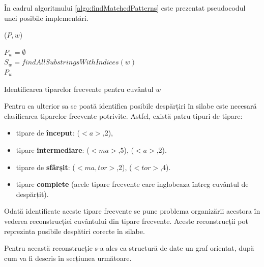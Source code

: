 În cadrul algoritmului \ref{algo:findMatchedPatterns} este prezentat pseudocodul unei posibile implementări.

\begin{algorithm}[H]
\vspace{.5cm}
\SetAlgoLined
{}

\ppg($P, w$) \\

$P_w = \emptyset$ \\
$S_w = findAllSubstringsWithIndices(w)$ \\
\KwRet $P_w$
\caption{Identificarea tiparelor frecvente pentru cuvântul $w$}
\label{algo:findMatchedPatterns}
\vspace{.5cm}
\end{algorithm}
\vspace{1cm}

Pentru ca ulterior sa se poată identifica posibile despărțiri în silabe este necesară clasificarea tiparelor frecvente potrivite. Astfel, există patru tipuri de tipare:  

\begin{itemize}
\item tipare de \textbf{început}: ($<a>$,2),
\item tipare \textbf{intermediare}: ($<ma>$,5), ($<a>$,2).
\item tipare de \textbf{sfârșit}: ($<ma, tor>$,2), ($<tor>$,4).  
\item tipare \textbf{complete} (acele tipare frecvente care inglobeaza întreg cuvântul de despărțit).
\end{itemize}



Odată identificate aceste tipare frecvente se pune problema organizării acestora în vederea reconstrucției cuvântului din tipare frecvente. Aceste reconstrucții pot reprezinta posibile despătiri corecte în silabe. 

Pentru această reconstrucție s-a ales ca structură de date un graf orientat, după cum va fi descris în secțiunea următoare.

